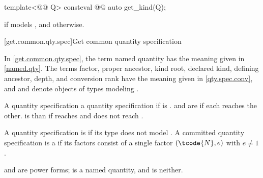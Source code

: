 \begin{itemdecl}
template<@@ Q>
consteval @@ auto get_kind(Q);
\end{itemdecl}

\begin{itemdescr}
\pnum
\returns
{}
if  models ,
and  otherwise.
\end{itemdescr}

[get.common.qty.spec]{Get common quantity specification}

\pnum
In \ref{get.common.qty.spec}, the term named quantity has the meaning given in \ref{named.qty}.
The terms factor, proper ancestor, kind root, declared kind, defining ancestor, depth, and conversion rank
have the meaning given in \ref{qty.spec.conv}, and
 and  denote objects of types modeling .

\pnum
A quantity specification   a quantity specification 
if  is .
 and  are  if each reaches the other.
 is  than 
if  reaches  and  does not reach .

\pnum
A quantity specification is  if its type does not model
.
A committed quantity specification is a 
if its factors consist of a single factor $(\tcode{N}, e)$ with $e \neq 1$.
\begin{note}
 and  are power forms;
 is a named quantity, and  is neither.
\end{note}


